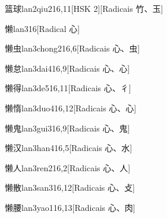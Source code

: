 \begin{entry}{篮球}{lan2qiu2}{16,11}[HSK 2][Radicais ⽵、⽟]
\end{entry}

\begin{entry}{懒}{lan3}{16}[Radical ⼼]
\end{entry}

\begin{entry}{懒虫}{lan3chong2}{16,6}[Radicais ⼼、⾍]
\end{entry}

\begin{entry}{懒怠}{lan3dai4}{16,9}[Radicais ⼼、⼼]
\end{entry}

\begin{entry}{懒得}{lan3de5}{16,11}[Radicais ⼼、⼻]
\end{entry}

\begin{entry}{懒惰}{lan3duo4}{16,12}[Radicais ⼼、⼼]
\end{entry}

\begin{entry}{懒鬼}{lan3gui3}{16,9}[Radicais ⼼、⿁]
\end{entry}

\begin{entry}{懒汉}{lan3han4}{16,5}[Radicais ⼼、⽔]
\end{entry}

\begin{entry}{懒人}{lan3ren2}{16,2}[Radicais ⼼、⼈]
\end{entry}

\begin{entry}{懒散}{lan3san3}{16,12}[Radicais ⼼、⽁]
\end{entry}

\begin{entry}{懒腰}{lan3yao1}{16,13}[Radicais ⼼、⾁]
\end{entry}

